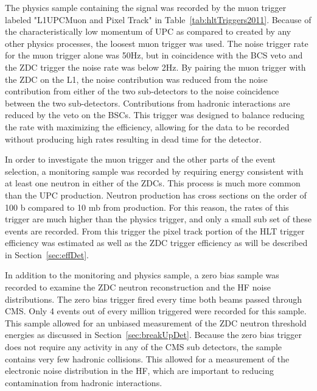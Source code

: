      The physics sample containing the \JPsi{} signal was recorded by the muon 
        trigger labeled "L1UPCMuon and Pixel Track" in 
        Table~\ref{tab:hltTriggers2011}. 
      Because of the characteristically low momentum of UPC \JPsi{} as compared
        to \JPsi{} created by any other physics processes, the loosest muon 
        trigger was used.
      The noise trigger rate for the muon trigger alone was 50Hz, but in 
        coincidence with the BCS veto and the ZDC trigger the noise rate was
        below 2Hz. 
      By pairing the muon trigger with the ZDC on the L1, the noise contribution
        was reduced from the noise contribution from either of the two 
        sub-detectors to the noise coincidence between the two sub-detectors. 
      Contributions from hadronic interactions are reduced by the veto on the 
        BSCs.
      This trigger was designed to balance reducing the rate with maximizing 
        the efficiency, allowing for the data to be recorded without 
        producing high rates resulting in dead time for the detector.  
      
      In order to investigate the muon trigger and the other parts of the event 
        selection, a monitoring sample was recorded by requiring energy 
        consistent with at least one neutron in either of the ZDCs.
      This process is much more common than the UPC \JPsi{} production.
      Neutron production has cross sections on the order of 100 b compared
        to 10 mb from \JPsi{} production. 
      For this reason, the rates of this trigger are much higher than the physics
        trigger, and only a small sub set of these events are recorded.
      From this trigger the pixel track portion of the HLT trigger efficiency 
        was estimated as well as the ZDC trigger efficiency as will be described 
        in Section~\ref{sec:effDet}. 
  
      In addition to the monitoring and physics sample, a zero bias sample was 
        recorded to examine the ZDC neutron reconstruction and the HF noise 
        distributions. 
      The zero bias trigger fired every time both beams passed through CMS. 
      Only 4 events out of every million triggered were recorded for this sample. 
      This sample allowed for an unbiased measurement of the ZDC neutron 
        threshold energies as discussed in Section~\ref{sec:breakUpDet}. 
      Because the zero bias trigger does not require any activity in any of the
        CMS sub detectors, the sample contains very few hadronic collisions. 
      This allowed for a measurement of the electronic noise distribution in
        the HF, which are important to reducing contamination from hadronic
        interactions.
  
